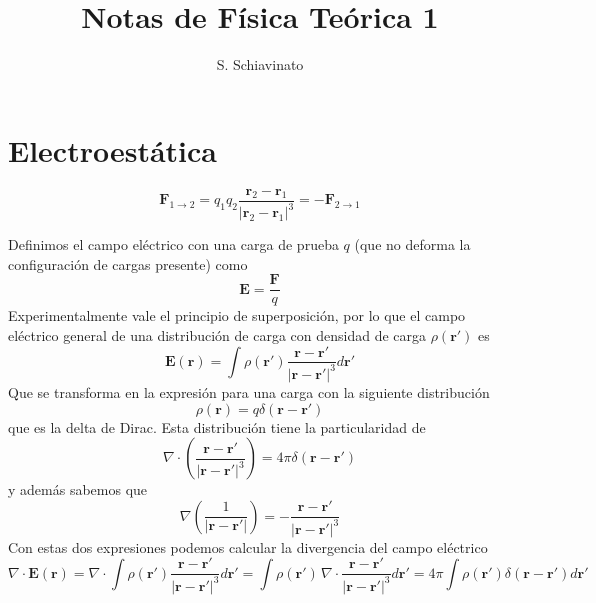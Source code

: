 ﻿\documentclass{article}
\title{Notas de Física Teórica 1}
\author{S. Schiavinato}
\date{}
\numberwithin{equation}{section} %
\renewcommand{\vec}[1]{\boldsymbol{#1}}
\begin{document}
\maketitle
\tableofcontents



\section{Electroestática}

\begin{equation}
\vec{F}_{1\to2} = q_1 q_2\frac{\vec{r}_2 - \vec{r}_1}{|\vec{r}_2 - \vec{r}_1|^3} = - \vec{F}_{2\to1}
\label{eq:electroestatica_coulomb}
\end{equation}

Definimos el campo eléctrico con una carga de prueba $q$ (que no deforma la configuración de cargas presente) como
\begin{equation}
\vec{E} = \frac{\vec{F}}{q}
\label{eq:campo_electrico}
\end{equation}
Experimentalmente vale el principio de superposición, por lo que el campo eléctrico general de una distribución de carga con densidad de carga $\rho(\vec{r}')$ es 
\begin{equation}
\vec{E}(\vec{r}) = \int \rho(\vec{r}') \frac{\vec{r} - \vec{r}'}{|\vec{r} - \vec{r}'|^3} d\vec{r}'
\label{eq:campo_electrico_dist_carga}
\end{equation}
Que se transforma en la expresión para una carga con la siguiente distribución
\begin{equation}
 \rho(\vec{r}) = q \delta(\vec{r} - \vec{r}')
\end{equation}
que es la delta de Dirac. Esta distribución tiene la particularidad de
\begin{equation}
\nabla \cdot \left(\frac{\vec{r} - \vec{r}'}{|\vec{r} - \vec{r}'|^3}\right) = 4\pi\delta(\vec{r} - \vec{r}')
\end{equation}
y además sabemos que
\begin{equation}
\nabla \left(\frac{1}{|\vec{r} - \vec{r}'|}\right) = -\frac{\vec{r} - \vec{r}'}{|\vec{r} - \vec{r}'|^3}
\end{equation}
Con estas dos expresiones podemos calcular la divergencia del campo eléctrico
\[ \nabla \cdot \vec{E}(\vec{r}) = \nabla \cdot \int \rho(\vec{r}') \frac{\vec{r} - \vec{r}'}{|\vec{r} - \vec{r}'|^3} d\vec{r}' = \int \rho(\vec{r}') \, \nabla \cdot \frac{\vec{r} - \vec{r}'}{|\vec{r} - \vec{r}'|^3} d\vec{r}' = 4\pi \int \rho(\vec{r}') \delta(\vec{r} - \vec{r}') d\vec{r}'\]
\end{document}
